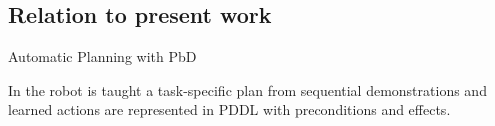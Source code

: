\subsection{Relation to present work}
Automatic Planning with PbD


In \cite{veeraraghavan2008teaching} the robot is taught a task-specific plan from sequential demonstrations and  learned actions are represented in PDDL with preconditions and effects.
